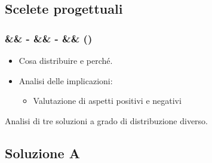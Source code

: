 \documentclass[slidestop,compress,blackandwhite]{beamer}
\newcommand{\ii}[1]{\textit{#1}}
\newcommand{\treno}{\ii{treno}}
\newcommand{\treni}{\ii{treni}}
\newcommand{\viaggiatore}{\ii{viaggiatore}}
\newcommand{\viaggiatori}{\ii{viaggiatori}}
\newcommand{\stazione}{\ii{stazione}}
\newcommand{\stazioni}{\ii{stazioni}}
\newcommand{\biglietteria}{\ii{biglietteria}}
\newcommand{\controller}{\ii{controllo centrale}}
\newcommand{\newtitle}[4]{
	#1 
	\ifx&#2&%
	\else
  		\large- #2
	\fi
	\ifx&#3&%
	\else
  		\normalsize- #3
	\fi
	\ifx&#4&%
	\else
  		\normalsize (#4)
	\fi
}
\newcommand{\newframe}[5]{
	\begin{frame}
		\frametitle{\newtitle{#1}{#2}{#3}{#4}}
		#5
	\end{frame}
}
\newcommand{\myitemize}[1]{\begin{itemize}#1\end{itemize}}
\begin{document}
%	
%	
%	
	
	\subsection{Scelete progettuali}\label{scelte}
	
	\newframe{}{}{}{}{
		
		\begin{itemize}
			\item Cosa distribuire e perché.
			\item Analisi delle implicazioni:
				\myitemize{
					\item Valutazione di aspetti positivi e negativi
				}
		\end{itemize}
		
		Analisi di tre soluzioni a grado di distribuzione diverso. 
		
	}
	
	\subsection{Soluzione A}
	
	
\end{document}

